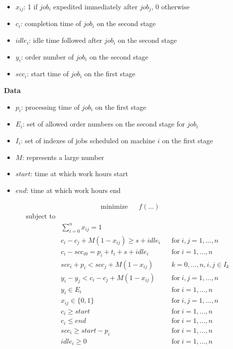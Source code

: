 \documentclass{ctuthesis}
\begin{document}
\begin{itemize}
\item $x_{ij}$: 1 if $job_i$ expedited immediately after $job_j$, 0 otherwise
\item$c_i$: completion time of $job_i$ on the second stage
\item$idle_i$: idle time followed after $job_i$ on the second stage
\item$y_i$: order number of $job_i$ on the second stage
\item$scc_i$: start time of $job_i$ on the first stage 
\end{itemize}
\textbf{Data}
\begin{itemize}
\item$p_i$: processing time of $job_i$ on the first stage
\item$E_i$: set of allowed order numbers on the second stage for $job_i$
\item$I_i$: set of indexes of jobs scheduled on machine $i$ on the first stage
\item$M$: represents a large number
\item$start$: time at which work hours start
\item$end$: time at which work hours end
\end{itemize}

\begin{equation}
\begin{aligned}
&\text{minimize}
&&f(\ldots)
\end{aligned}
\end{equation}
\begin{equation}
\begin{aligned}
\text{subject to}\\
& \sum_{i=0}^{n} x_{ij} = 1 &&\\
& c_{i} - c_{j} + M(1 - x_{ij}) \geq s + idle_{i} && \text{for}\; i,j = 1, \ldots, n\\
& c_{i} - scc_{i0} = p_{i} + t_i + s + idle_i && \text{for}\; i = 1, \ldots, n\\
& scc_{i} + p_i < scc_j + M(1 - x_{ij}) && k = 0,\ldots,n, i,j \in I_k\\
& y_{i} - y_{j} < c_i - c_j + M(1 - x_{ij}) && \text{for}\; i,j = 1, \ldots, n\\
& y_i \in E_i && \text{for}\; i = 1, \ldots, n\\
& x_{ij} \in \{0, 1\}  && \text{for}\; i,j = 1, \ldots, n\\ 
& c_i \geq start && \text{for}\; i = 1, \ldots, n\\
& c_i \leq end && \text{for}\; i = 1, \ldots, n\\
& scc_{i} \geq start - p_i && \text{for}\; i = 1, \ldots, n\\
& idle_i \geq 0 && \text{for}\; i = 1, \ldots, n\\
\end{aligned}
\end{equation}
\\
\end{document}
